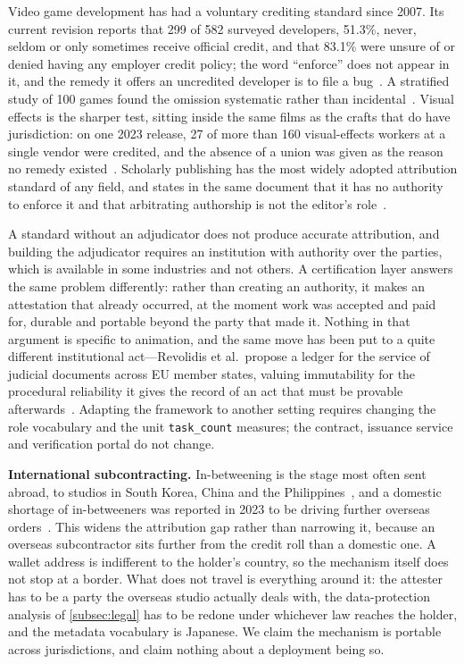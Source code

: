 Video game development has had a voluntary crediting standard since 2007. Its current
revision reports that 299 of 582 surveyed developers, 51.3\%, never, seldom or only
sometimes receive official credit, and that 83.1\% were unsure of or denied having any
employer credit policy; the word ``enforce'' does not appear in it, and the remedy it
offers an uncredited developer is to file a bug~\cite{igda2023crediting}. A stratified
study of 100 games found the omission systematic rather than
incidental~\cite{svelch2022credit}. Visual effects is the sharper test, sitting inside the
same films as the crafts that do have jurisdiction: on one 2023 release, 27 of more than
160 visual-effects workers at a single vendor were credited, and the absence of a union
was given as the reason no remedy existed~\cite{amidi2023vfx}. Scholarly publishing has
the most widely adopted attribution standard of any field, and states in the same document
that it has no authority to enforce it and that arbitrating authorship is not the editor's
role~\cite{icmje2026recommendations}.

A standard without an adjudicator does not produce accurate attribution, and building
the adjudicator requires an institution with authority over the parties, which is
available in some industries and not others. A certification layer answers the same
problem differently: rather than creating an authority, it makes an attestation that
already occurred, at the moment work was accepted and paid for, durable and portable
beyond the party that made it. Nothing in that argument is specific to animation, and the
same move has been put to a quite different institutional act---Revolidis et al.\ propose
a ledger for the service of judicial documents across EU member states, valuing
immutability for the procedural reliability it gives the record of an act that must be
provable afterwards~\cite{revolidis2025justice}. Adapting the framework to another setting
requires changing the role vocabulary and the unit \texttt{task\_count} measures; the
contract, issuance service and verification portal do not change.

\textbf{International subcontracting.}
In-betweening is the stage most often sent abroad, to studios in South Korea, China and
the Philippines~\cite{mori2011pitfall,tschang2010outsourcing}, and a domestic shortage
of in-betweeners was reported in 2023 to be driving further overseas
orders~\cite{oki2026survey}. This widens the attribution gap rather than narrowing it,
because an overseas subcontractor sits further from the credit roll than a domestic one.
A wallet address is indifferent to the holder's country, so the mechanism itself does not
stop at a border. What does not travel is everything around it: the attester has to be a
party the overseas studio actually deals with, the data-protection analysis of
\cref{subsec:legal} has to be redone under whichever law reaches the holder, and the
metadata vocabulary is Japanese. We claim the mechanism is portable across
jurisdictions, and claim nothing about a deployment being so.
